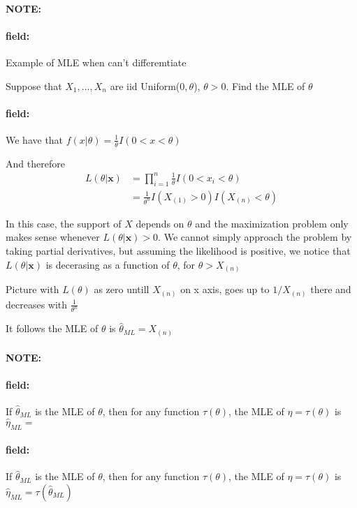 \documentclass[12pt]{article}
\newenvironment{note}{\paragraph{NOTE:}}{}
\newenvironment{field}{\paragraph{field:}}{}
\begin{document}
\begin{note}
  \begin{field}
    Example of MLE when can't differemtiate

    Suppose that $X_1, \ldots , X_n$ are iid Uniform($0,\theta$), $\theta > 0$. Find the MLE of $\theta$
  \end{field}
  \begin{field}
    We have that $f(x|\theta) = \frac{1}{\theta}I(0<x<\theta)$

    And therefore
    \begin{align*}
      L(\theta|\mathbf{x}) &= \prod _{i = 1}^n \frac{1}{\theta} I(0 < x_i < \theta)\\
      &= \frac{1}{\theta^n} I(X_{(1)} > 0)I(X_{(n)}< \theta)
    \end{align*}

    In this case, the support of $X$ depends on $\theta$ and the maximization problem only makes sense whenever $L(\theta|\mathbf{x}) > 0$. We cannot simply approach the problem by taking partial derivatives, but assuming the likelihood is positive, we notice that $L(\theta|\mathbf{x})$ is decerasing as a function of $\theta$, for $\theta > X_{(n)}$

    Picture with $L(\theta)$ as zero untill $X_{(n)}$ on x axis, goes up to $1/X_{(n)}$ there and decreases with $\frac{1}{\theta^n}$

    It follows the MLE of $\theta$ is $\hat{\theta}_{ML} = X_{(n)}$

  \end{field}
\end{note}







\begin{note}
  \begin{field}
    If $\hat{\theta}_{ML}$ is the MLE of $\theta$, then for any function $\tau(\theta)$, the MLE of $\eta =\tau(\theta)$ is $\hat{\eta}_{ML} =$
  \end{field}
  \begin{field}
    If $\hat{\theta}_{ML}$ is the MLE of $\theta$, then for any function $\tau(\theta)$, the MLE of $\eta =\tau(\theta)$ is $\hat{\eta}_{ML} = \tau(\hat{\theta}_{ML})$
  \end{field}
\end{note}
\end{document}
